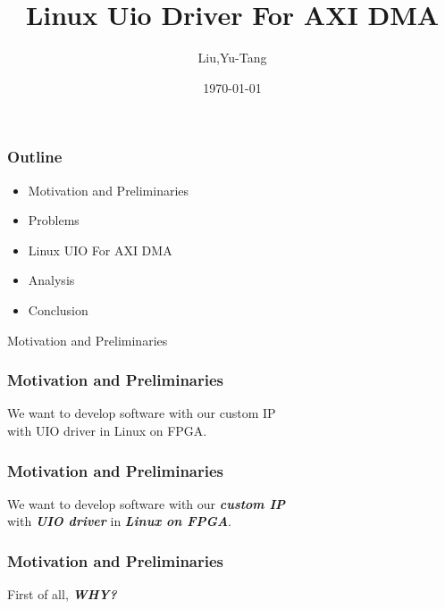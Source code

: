 \documentclass{beamer}
\title{Linux Uio Driver For AXI DMA}
\author{Liu,Yu-Tang}
\date{\today}
\begin{document}
 

\maketitle  %

\begin{frame}
\frametitle{Outline}
\begin{itemize}
\item Motivation and Preliminaries
\item Problems
\item Linux UIO For AXI DMA
\item Analysis
\item Conclusion
\end{itemize}
\end{frame}


\begin{frame}
\centering Motivation and Preliminaries
\end{frame}

\begin{frame}
\frametitle{Motivation \textcolor[rgb]{0.5,0.5,0.3}{and Preliminaries}}
\centering We want to develop software with our custom IP \\
\centering with UIO driver in Linux on FPGA. 
\end{frame}

\begin{frame}
\frametitle{Motivation \textcolor[rgb]{0.5,0.5,0.3}{and Preliminaries}}
\centering We want to develop software with our \textbf{\emph{custom IP}} \\
\centering with \textbf{\emph{UIO driver}} in \textbf{\emph{Linux on FPGA}}. 
\end{frame}


\begin{frame}
\frametitle{Motivation \textcolor[rgb]{0.5,0.5,0.3}{and Preliminaries}}
\centering First of all, \textbf{\emph{WHY?}}
\end{frame}
\end{document}
